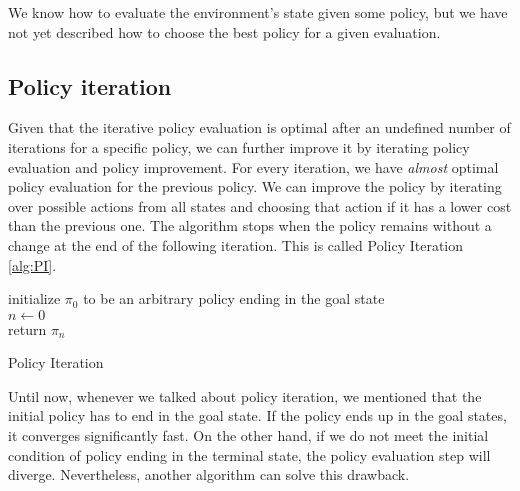 We know how to evaluate the environment's state given some policy, but we have not yet described how to choose the best policy for a given evaluation. 

\subsection{Policy iteration}
Given that the iterative policy evaluation is optimal after an undefined number of iterations for a specific policy, we can further improve it by iterating policy evaluation and policy improvement.
For every iteration, we have \textit{almost} optimal policy evaluation for the previous policy. We can improve the policy by iterating over possible actions from all states and choosing that action if it has a lower cost than the previous one. The algorithm stops when the policy remains without a change at the end of the following iteration. This is called Policy Iteration \ref{alg:PI}.

\LinesNumbered
\begin{algorithm}[ht]
\SetAlgoLined
initialize $\pi_0$ to be an arbitrary policy ending in the goal state\\
$n \xleftarrow{} 0$ \\
return $\pi_n$
\caption{Policy Iteration}
\label{alg:PI}
\end{algorithm}

Until now, whenever we talked about policy iteration, we mentioned that the initial policy has to end in the goal state. If the policy ends up in the goal states, it converges significantly fast. On the other hand, if we do not meet the initial condition of policy ending in the terminal state, the policy evaluation step will diverge. Nevertheless, another algorithm can solve this drawback.


